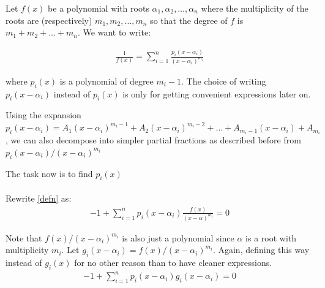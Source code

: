 \documentclass{article}
\begin{document}
Let $f(x)$ be a polynomial with roots $\alpha_1, \alpha_2,\dots, \alpha_n$ where the multiplicity of the roots are (respectively) $m_1, m_2, \dots, m_n$ so that the degree of $f$ is $m_1+m_2+\dots + m_n$. We want to write:

\begin{align}
    \frac{1}{f(x)} = \sum_{i=1}^{n} \frac{p_i(x-\alpha_i)}{(x-\alpha_i)^{m_i}} \label{defn}
\end{align}

where $p_i(x)$ is a polynomial of degree $m_i - 1$. The choice of writing $p_i(x-\alpha_i)$ instead of $p_i(x)$ is only for getting convenient expressions later on.

\begin{tcolorbox}
Using the expansion $p_i(x-\alpha_i) = A_1(x-\alpha_i)^{m_i - 1} + A_2(x-\alpha_i)^{m_i - 2} + \dots + A_{m_i - 1}(x-\alpha_i) + A_{m_i}$, we can also decompose into simpler partial fractions as described before from $p_i(x-\alpha_i)/(x-\alpha_i)^{m_i}$
\end{tcolorbox}

The task now is to find $p_i(x)$
\\\\
Rewrite \eqref{defn} as:
\begin{align}
    -1 + \sum_{i=1}^{n}p_i(x-\alpha_i)\frac{f(x)}{(x-\alpha)^{m_i}} = 0
\end{align}

Note that $f(x)/(x-\alpha_i)^{m_i}$ is also just a polynomial since $\alpha$ is a root with multiplicity $m_i$. Let $g_i(x-\alpha_i) = f(x)/(x-\alpha_i)^{m_i}$. Again, defining this way instead of $g_i(x)$ for no other reason than to have cleaner expressions.
\begin{align}
    -1 + \sum_{i=1}^{n}p_i(x-\alpha_i)g_i(x-\alpha_i) = 0
\end{align}
\end{document}
